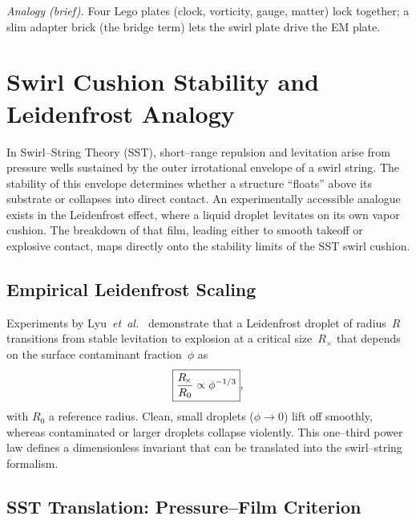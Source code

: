 \documentclass[10pt,reprint,aps,onecolumn,nofootinbib]{revtex4-2}
\begin{document}
    \medskip
    \noindent\emph{Analogy (brief).}
    Four Lego plates (clock, vorticity, gauge, matter) lock together; a slim adapter brick (the bridge term) lets the swirl plate drive the EM plate.

\section{Swirl Cushion Stability and Leidenfrost Analogy}\label{sec:swirl-cushion-leidenfrost}

    \begin{tcolorbox}[colframe=black, title={Canonical Context}]
    In Swirl--String Theory (SST), short--range repulsion and levitation arise from
    pressure wells sustained by the outer irrotational envelope of a swirl string.
    The stability of this envelope determines whether a structure ``floats'' above
    its substrate or collapses into direct contact.  An experimentally accessible
    analogue exists in the Leidenfrost effect, where a liquid droplet levitates on
    its own vapor cushion.  The breakdown of that film, leading either to smooth
    takeoff or explosive contact, maps directly onto the stability limits of the
    SST swirl cushion.
    \end{tcolorbox}

    \subsection{Empirical Leidenfrost Scaling}

    Experiments by Lyu~\emph{et~al.}~\cite{Lyu2019LeidenfrostFate}
    demonstrate that a Leidenfrost droplet of radius~$R$ transitions from
    stable levitation to explosion at a critical size~$R_{\!\times}$ that
    depends on the surface contaminant fraction~$\phi$ as
    \begin{equation}
    \boxed{%
    \frac{R_{\!\times}}{R_0} \propto \phi^{-1/3}},
    \label{eq:Rphi-law}
    \end{equation}
    with $R_0$ a reference radius.
    Clean, small droplets ($\phi\!\to\!0$) lift off smoothly, whereas
    contaminated or larger droplets collapse violently.
    This one--third power law defines a dimensionless invariant that can be
    translated into the swirl--string formalism.

    \subsection{SST Translation: Pressure--Film Criterion}
\end{document}
